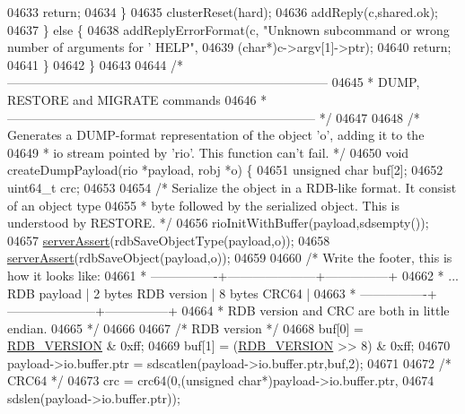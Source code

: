 \begin{DoxyCode}
{{{{{{{{{{{{{{{{{{{{{{{{{{{{{{{{{{{{{{{{{{{{{{{{{{{{{{{{{{{{{{{{{{{{{{{{{{{{{{{{{{{{{{{{{{{{{{{{{{{{{{{{{{04633             \textcolor{keywordflow}{return};
04634         \}
04635         clusterReset(hard);
04636         addReply(c,shared.ok);
04637     \} \textcolor{keywordflow}{else} \{
04638          addReplyErrorFormat(c, \textcolor{stringliteral}{"Unknown subcommand or wrong number of arguments for '%
       HELP"},
04639             (\textcolor{keywordtype}{char}*)c->argv[1]->ptr);
04640         \textcolor{keywordflow}{return};
04641     \}
04642 \}
04643 
04644 \textcolor{comment}{/* -----------------------------------------------------------------------------}
04645 \textcolor{comment}{ * DUMP, RESTORE and MIGRATE commands}
04646 \textcolor{comment}{ * -------------------------------------------------------------------------- */}
04647 
04648 \textcolor{comment}{/* Generates a DUMP-format representation of the object 'o', adding it to the}
04649 \textcolor{comment}{ * io stream pointed by 'rio'. This function can't fail. */}
04650 \textcolor{keywordtype}{void} createDumpPayload(rio *payload, robj *o) \{
04651     \textcolor{keywordtype}{unsigned} \textcolor{keywordtype}{char} buf[2];
04652     uint64\_t crc;
04653 
04654     \textcolor{comment}{/* Serialize the object in a RDB-like format. It consist of an object type}
04655 \textcolor{comment}{     * byte followed by the serialized object. This is understood by RESTORE. */}
04656     rioInitWithBuffer(payload,sdsempty());
04657     \hyperlink{server_8h_a88114b5169b4c382df6b56506285e56a}{serverAssert}(rdbSaveObjectType(payload,o));
04658     \hyperlink{server_8h_a88114b5169b4c382df6b56506285e56a}{serverAssert}(rdbSaveObject(payload,o));
04659 
04660     \textcolor{comment}{/* Write the footer, this is how it looks like:}
04661 \textcolor{comment}{     * ----------------+---------------------+---------------+}
04662 \textcolor{comment}{     * ... RDB payload | 2 bytes RDB version | 8 bytes CRC64 |}
04663 \textcolor{comment}{     * ----------------+---------------------+---------------+}
04664 \textcolor{comment}{     * RDB version and CRC are both in little endian.}
04665 \textcolor{comment}{     */}
04666 
04667     \textcolor{comment}{/* RDB version */}
04668     buf[0] = \hyperlink{rdb_8h_ae34418fdbb9794fb7558a4f58bdc1cad}{RDB\_VERSION} & 0xff;
04669     buf[1] = (\hyperlink{rdb_8h_ae34418fdbb9794fb7558a4f58bdc1cad}{RDB\_VERSION} >> 8) & 0xff;
04670     payload->io.buffer.ptr = sdscatlen(payload->io.buffer.ptr,buf,2);
04671 
04672     \textcolor{comment}{/* CRC64 */}
04673     crc = crc64(0,(\textcolor{keywordtype}{unsigned} \textcolor{keywordtype}{char}*)payload->io.buffer.ptr,
04674                 sdslen(payload->io.buffer.ptr));
}}}}}}}}}}}}}}}}}}}}}}}}}}}}}}}}}}}}}}}}}}}}}}}}}}}}}}}}}}}}}}}}}}}}}}}}}}}}}}}}}}}}}}}}}}}}}}}}}}}}}}}}}}
\end{DoxyCode}

